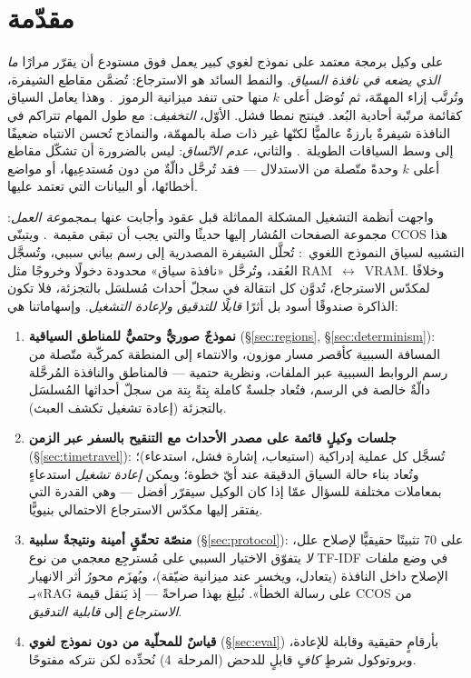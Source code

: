 \documentclass[11pt]{article}
\begin{document}
\section{مقدّمة}

على وكيل برمجة معتمد على نموذج لغوي كبير يعمل فوق مستودع أن يقرّر مرارًا \emph{ما الذي
يضعه في نافذة السياق}. والنمط السائد هو الاسترجاع: تُضمَّن مقاطع الشيفرة، وتُرتَّب إزاء
المهمّة، ثم تُوصَل أعلى $k$ منها حتى تنفد ميزانية الرموز~\cite{lewis2020rag}. وهذا يعامل
السياق كقائمة مرتّبة أحادية البُعد. فينتج نمطا فشل. الأوّل، \emph{التخفيف}: مع طول المهام
تتراكم في النافذة شيفرةٌ بارزةٌ عالميًّا لكنّها غير ذات صلة بالمهمّة، والنماذج تُحسن
الانتباه ضعيفًا إلى وسط السياقات الطويلة~\cite{liu2023lost}. والثاني، \emph{عدم الاتّساق}:
ليس بالضرورة أن تشكّل مقاطع أعلى $k$ وحدةً متّصلة من الاستدلال --- فقد تُرحَّل دالّةٌ من
دون مُستدعِيها، أو مواضع أخطائها، أو البيانات التي تعتمد عليها.

واجهت أنظمة التشغيل المشكلة المماثلة قبل عقود وأجابت عنها بـ\emph{مجموعة العمل}: مجموعة
الصفحات المُشار إليها حديثًا والتي يجب أن تبقى مقيمة~\cite{denning1968working}. ويتبنّى
CCOS هذا التشبيه لسياق النموذج اللغوي~\cite{packer2023memgpt}: تُحلَّل الشيفرة المصدرية إلى
رسم بياني سببي، وتُسجَّل العُقد، وتُرحَّل «نافذة سياق» محدودة دخولًا وخروجًا مثل
RAM~$\leftrightarrow$~VRAM. وخلافًا لمكدّس الاسترجاع، تُدوَّن كل انتقالة في سجلّ أحداث
مُسلسَل بالتجزئة، فلا تكون الذاكرة صندوقًا أسود بل أثرًا \emph{قابلًا للتدقيق ولإعادة
التشغيل}. وإسهاماتنا هي:

\begin{enumerate}
  \item \textbf{نموذجٌ صوريٌّ وحتميٌّ للمناطق السياقية} (\S\ref{sec:regions},
  \S\ref{sec:determinism}): المسافة السببية كأقصر مسار موزون، والانتماء إلى المنطقة
  كمركّبة متّصلة من رسم الروابط السببية عبر الملفات، ونظرية حتمية --- فالمناطق والنافذة
  المُرحَّلة دالّةٌ خالصة في الرسم، فتُعاد جلسةٌ كاملة بِتةً بِتة من سجلّ أحداثها المُسلسَل
  بالتجزئة (إعادة تشغيل تكشف العبث).
  \item \textbf{جلسات وكيلٍ قائمة على مصدر الأحداث مع التنقيح بالسفر عبر الزمن}
  (\S\ref{sec:timetravel}): تُسجَّل كل عملية إدراكية (استيعاب، إشارة فشل، استدعاء)؛
  وتُعاد بناء حالة السياق الدقيقة عند أيّ خطوة؛ ويمكن \emph{إعادة تشغيل} استدعاءٍ بمعاملات
  مختلفة للسؤال عمّا إذا كان الوكيل سيقرّر أفضل --- وهي القدرة التي يفتقر إليها مكدّس
  الاسترجاع الاحتمالي بنيويًّا.
  \item \textbf{منصّة تحقّقٍ أمينة ونتيجةٌ سلبية} (\S\ref{sec:protocol}): على $70$ تثبيتًا
  حقيقيًّا لإصلاح علل، \emph{لا} يتفوّق الاختيار السببي على مُسترجِع معجمي من نوع TF-IDF في
  وضع ملفات الإصلاح داخل النافذة (يتعادل، ويخسر عند ميزانية ضيّقة)، ويُهزَم محورُ أثر
  الانهيار بـ«RAG على رسالة الخطأ». نُبلِغ بهذا صراحةً --- إذ يَنقل قيمة CCOS من
  \emph{الاسترجاع} إلى \emph{قابلية التدقيق}.
  \item \textbf{قياسٌ للمحلّية من دون نموذج لغوي} (\S\ref{sec:eval}) بأرقامٍ حقيقية وقابلة
  للإعادة، وبروتوكول شرطٍ \emph{كافٍ} قابلٍ للدحض (المرحلة~4) نُحدِّده لكن نتركه مفتوحًا.
\end{enumerate}
\end{document}
